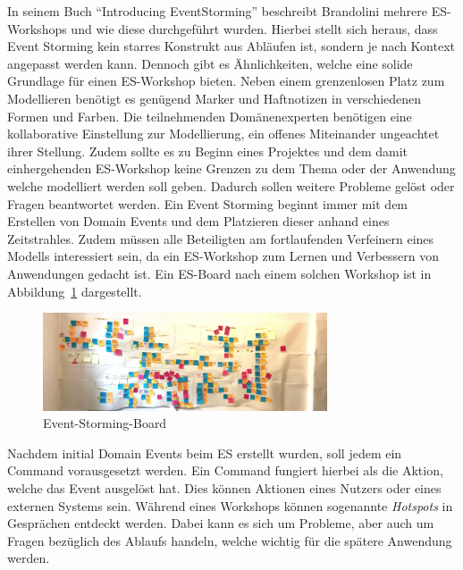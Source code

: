 In seinem Buch ``Introducing EventStorming'' beschreibt Brandolini mehrere \ac{ES}-Workshops und wie diese durchgeführt wurden\cite*{introES}.
Hierbei stellt sich heraus, dass Event Storming kein starres Konstrukt aus Abläufen ist, sondern je nach Kontext angepasst werden kann.
Dennoch gibt es Ähnlichkeiten, welche eine solide Grundlage für einen \ac{ES}-Workshop bieten\cite*{introES}.
Neben einem grenzenlosen Platz zum Modellieren benötigt es genügend Marker und Haftnotizen in verschiedenen Formen und Farben.
Die teilnehmenden Domänenexperten benötigen eine kollaborative Einstellung zur Modellierung, ein offenes Miteinander ungeachtet ihrer Stellung.
Zudem sollte es zu Beginn eines Projektes und dem damit einhergehenden \ac{ES}-Workshop keine Grenzen zu dem Thema oder der Anwendung welche modelliert werden soll geben.
Dadurch sollen weitere Probleme gelöst oder Fragen beantwortet werden.
Ein Event Storming beginnt immer mit dem Erstellen von Domain Events und dem Platzieren dieser anhand eines Zeitstrahles.
Zudem müssen alle Beteiligten am fortlaufenden Verfeinern eines Modells interessiert sein, da ein \ac{ES}-Workshop zum Lernen und Verbessern
von Anwendungen gedacht ist.
Ein \ac{ES}-Board nach einem solchen Workshop ist in Abbildung~\ref{fig:rlBoard} dargestellt\cite*{esBoard}.

\begin{figure}[ht]
    \centering
    \includegraphics[width=0.75\textwidth]{images/2.1/event-storming}
    \caption{Event-Storming-Board}
    \label{fig:rlBoard}
\end{figure}

Nachdem initial Domain Events beim \ac{ES} erstellt wurden, soll jedem ein Command vorausgesetzt werden.
Ein Command fungiert hierbei als die Aktion, welche das Event ausgelöst hat.
Dies können Aktionen eines Nutzers oder eines externen Systems sein.
Während eines Workshops können sogenannte \textit{Hotspots} in Gesprächen entdeckt werden.
Dabei kann es sich um Probleme, aber auch um Fragen bezüglich des Ablaufs handeln, welche wichtig für die spätere Anwendung werden.

